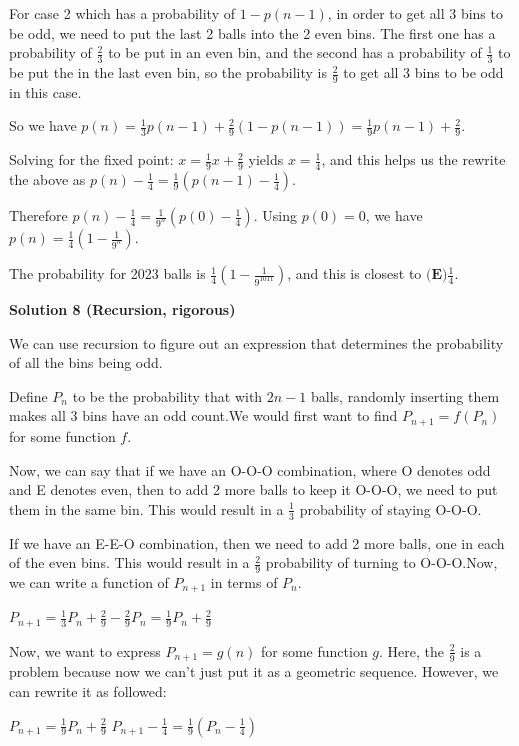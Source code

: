 \begin{enumerate}
 For case 2 which has a probability of $1-p(n-1)$, in order to get all 3 bins to be odd, we need to put the last 2 balls into the 2 even bins. The first one has a probability of $\frac{2}{3}$ to be put in an even bin, and the second has a probability of $\frac{1}{3}$ to be put the in the last even bin, so the probability is $\frac{2}{9}$ to get all 3 bins to be odd in this case.

 So we have $p(n)=\frac{1}{3} p(n-1) + \frac{2}{9} (1-p(n-1)) = \frac{1}{9} p(n-1) + \frac{2}{9}$.

 Solving for the fixed point: $x=\frac{1}{9} x + \frac{2}{9}$ yields $x=\frac{1}{4}$, and this helps us the rewrite the above as $p(n) - \frac{1}{4} = \frac{1}{9} (p(n-1)  - \frac{1}{4} )$.

 Therefore $p(n)-\frac{1}{4} = \frac{1}{9^n} (p(0) - \frac{1}{4})$. Using $p(0)=0$, we have $p(n)=\frac{1}{4} (1 - \frac{1}{9^n})$.

 The probability for 2023 balls is $\frac{1}{4} (1 - \frac{1}{9^{1011}})$, and this is closest to $\boxed{\textbf{(E)} \frac{1}{4}}$.

 



\textbf{Solution 8 (Recursion, rigorous)}

We can use recursion to figure out an expression that determines the probability of all the bins being odd.

 Define $P_n$ to be the probability that with $2n-1$ balls, randomly inserting them makes all 3 bins have an odd count.We would first want to find $P_{n+1}=f(P_n)$ for some function $f$.

 Now, we can say that if we have an O-O-O combination, where O denotes odd and E denotes even, then to add 2 more balls to keep it O-O-O, we need to put them in the same bin. This would result in a $\frac{1}{3}$ probability of staying O-O-O.

 If we have an E-E-O combination, then we need to add 2 more balls, one in each of the even bins. This would result in a $\frac{2}{9}$ probability of turning to O-O-O.Now, we can write a function of $P_{n+1}$ in terms of $P_n$.

 $P_{n+1}=\frac{1}{3}P_n+\frac{2}{9}-\frac{2}{9}P_n=\frac{1}{9}P_n+\frac{2}{9}$

 Now, we want to express $P_{n+1}=g(n)$ for some function $g$. Here, the $\frac{2}{9}$ is a problem because now we can't just put it as a geometric sequence. However, we can rewrite it as followed:

 $P_{n+1}=\frac{1}{9}P_n+\frac{2}{9}$
$P_{n+1}-\frac{1}{4}=\frac{1}{9}(P_n-\frac{1}{4})$


\end{enumerate}
